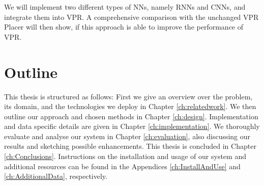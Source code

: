 We will implement two different types of \glspl{NN}, namely \glspl{RNN} and \glspl{CNN}, and integrate them into \gls{VPR}. A comprehensive comparison with the unchanged \gls{VPR} Placer will then show, if this approach is able to improve the performance of \gls{VPR}.

\section{Outline}

This thesis is structured as follows: First we give an overview over the problem, its domain, and the technologies we deploy in Chapter \ref{ch:relatedwork}. We then outline our approach and chosen methods in Chapter \ref{ch:design}. Implementation and data specific details are given in Chapter \ref{ch:implementation}. We thoroughly evaluate and analyse our system in Chapter \ref{ch:evaluation}, also discussing our results and sketching possible enhancements. This thesis is concluded in Chapter \ref{ch:Conclusions}. Instructions on the installation and usage of our system and additional resources can be found in the Appendices \ref{ch:InstallAndUse} and \ref{ch:AdditionalData}, respectively.